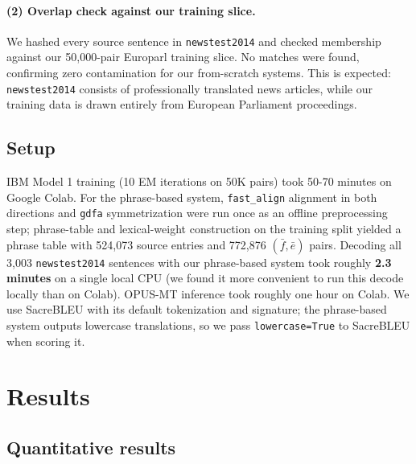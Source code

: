 \documentclass[11pt]{article}
\begin{document}
\paragraph{(2) Overlap check against our training slice.} We hashed every source sentence in \texttt{newstest2014} and checked membership against our 50{,}000-pair Europarl training slice. No matches were found, confirming zero contamination for our from-scratch systems. This is expected: \texttt{newstest2014} consists of professionally translated news articles, while our training data is drawn entirely from European Parliament proceedings.
 
\subsection{Setup}
IBM Model 1 training (10 EM iterations on 50K pairs) took 50-70 minutes on Google Colab. For the phrase-based system, \texttt{fast\_align} alignment in both directions and \texttt{gdfa} symmetrization were run once as an offline preprocessing step; phrase-table and lexical-weight construction on the training split yielded a phrase table with 524{,}073 source entries and 772{,}876 $(\bar{f}, \bar{e})$ pairs. Decoding all 3{,}003 \texttt{newstest2014} sentences with our phrase-based system took roughly \textbf{2.3 minutes} on a single local CPU (we found it more convenient to run this decode locally than on Colab). OPUS-MT inference took roughly one hour on Colab. We use SacreBLEU with its default tokenization and signature; the phrase-based system outputs lowercase translations, so we pass \texttt{lowercase=True} to SacreBLEU when scoring it.
 
\section{Results}
\label{sec:results}
 
\subsection{Quantitative results}
\end{document}
